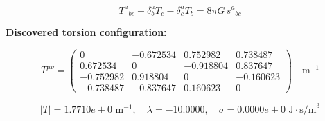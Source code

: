 
\begin{equation}
  T^a{}_{bc} + \delta^a_b T_c - \delta^a_c T_b = 8\pi G \, s^a{}_{bc}
\end{equation}

\textbf{Discovered torsion configuration:}

\begin{equation}
  T^{\mu\nu} = \begin{pmatrix}
    0 & -0.672534 & 0.752982 & 0.738487 \\
    0.672534 & 0 & -0.918804 & 0.837647 \\
    -0.752982 & 0.918804 & 0 & -0.160623 \\
    -0.738487 & -0.837647 & 0.160623 & 0
  \end{pmatrix} \quad \text{m}^{-1}
\end{equation}

\begin{equation}
  |T| = 1.7710e+0 \text{ m}^{-1}, \quad
  \lambda = -10.0000, \quad
  \sigma = 0.0000e+0 \text{ J}\cdot\text{s/m}^3
\end{equation}